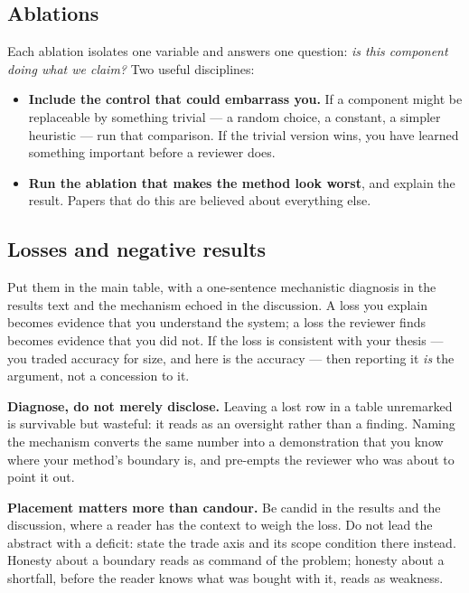 \documentclass[11pt,a4paper]{article}
\newcommand{\lead}[1]{\medskip\noindent\textbf{#1}\quad}
\begin{document}
\subsection*{Ablations}

Each ablation isolates one variable and answers one question: \emph{is this
component doing what we claim?} Two useful disciplines:

\begin{itemize}
  \item \textbf{Include the control that could embarrass you.} If a component
    might be replaceable by something trivial --- a random choice, a constant,
    a simpler heuristic --- run that comparison. If the trivial version wins,
    you have learned something important before a reviewer does.
  \item \textbf{Run the ablation that makes the method look worst}, and
    explain the result. Papers that do this are believed about everything
    else.
\end{itemize}

\subsection*{Losses and negative results}

Put them in the main table, with a one-sentence mechanistic diagnosis in the
results text and the mechanism echoed in the discussion. A loss you explain
becomes evidence that you understand the system; a loss the reviewer finds
becomes evidence that you did not. If the loss is consistent with your thesis
--- you traded accuracy for size, and here is the accuracy --- then reporting
it \emph{is} the argument, not a concession to it.

\lead{Diagnose, do not merely disclose.} Leaving a lost row in a table
unremarked is survivable but wasteful: it reads as an oversight rather than a
finding. Naming the mechanism converts the same number into a demonstration
that you know where your method's boundary is, and pre-empts the reviewer who
was about to point it out.

\lead{Placement matters more than candour.} Be candid in the results and the
discussion, where a reader has the context to weigh the loss. Do not lead the
abstract with a deficit: state the trade axis and its scope condition there
instead. Honesty about a boundary reads as command of the problem; honesty
about a shortfall, before the reader knows what was bought with it, reads as
weakness.
\end{document}
